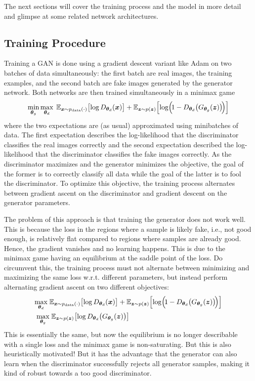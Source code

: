 		The next sections will cover the training process and the model in more detail and glimpse at some related network architectures.

		\subsection{Training Procedure}
			Training a GAN is done using a gradient descent variant like Adam on two batches of data simultaneously: the first batch are real images, the training examples, and the second batch are fake images generated by the generator network. Both networks are then trained simultaneously in a minimax game
			\begin{equation}
				\min_{\bm{\theta}_g} \max_{\bm{\theta}_d} \; \mathbb{E}_{\bm{x} \sim p_\mathrm{data}(\cdot)}\big[\! \log D_{\bm{\theta}_d}(\bm{x}) \big] + \mathbb{E}_{\bm{z} \sim p(\bm{z})}\Big[\! \log\!\Big(\! 1 - D_{\bm{\theta}_d}\big( G_{\bm{\theta}_g}(\bm{z}) \big) \!\Big) \Big]
			\end{equation}
			where the two expectations are (as usual) approximated using minibatches of data. The first expectation describes the log-likelihood that the discriminator classifies the real images correctly and the second expectation described the log-likelihood that the discriminator classifies the fake images correctly. As the discriminator maximizes and the generator minimizes the objective, the goal of the former is to correctly classify all data while the goal of the latter is to fool the discriminator. To optimize this objective, the training process alternates between gradient ascent on the discriminator and gradient descent on the generator parameters.

			The problem of this approach is that training the generator does not work well. This is because the loss in the regions where a sample is likely fake, i.e., not good enough, is relatively flat compared to regions where samples are already good. Hence, the gradient vanishes and no learning happens. This is due to the minimax game having an equilibrium at the saddle point of the loss. Do circumvent this, the training process must not alternate between minimizing and maximizing the same loss w.r.t. different parameters, but instead perform alternating gradient ascent on two different objectives:
			\begin{align}
				\max_{\bm{\theta}_d} \; & \mathbb{E}_{\bm{x} \sim p_\mathrm{data}(\cdot)}\big[\! \log D_{\bm{\theta}_d}(\bm{x}) \big] + \mathbb{E}_{\bm{z} \sim p(\bm{z})}\Big[\! \log\!\Big(\! 1 - D_{\bm{\theta}_d}\big( G_{\bm{\theta}_g}(\bm{z}) \big) \!\Big) \Big] \\
				\max_{\bm{\theta}_g}    & \; \mathbb{E}_{\bm{z} \sim p(\bm{z})}\big[\! \log D_{\bm{\theta}_d}\big( G_{\bm{\theta}_g}(\bm{z}) \big) \big]
			\end{align}
			This is essentially the same, but now the equilibrium is no longer describable with a single loss and the minimax game is non-saturating. But this is also heuristically motivated! But it has the advantage that the generator can also learn when the discriminator successfully rejects all generator samples, making it kind of robust towards a too good discriminator.

